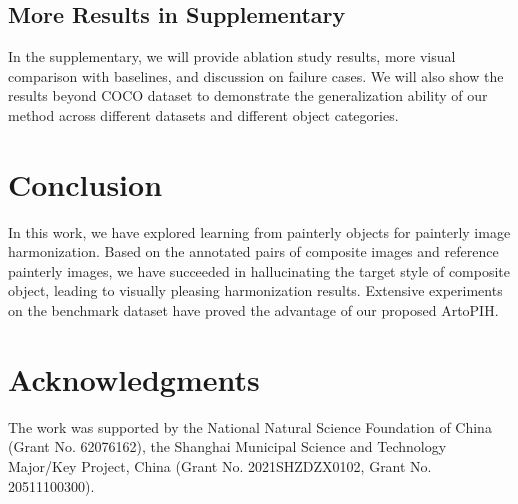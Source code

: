 \documentclass[letterpaper]{article} %
\begin{document}
\subsection{More Results in Supplementary}

In the supplementary, we will provide ablation study results, more visual comparison with baselines, and discussion on failure cases. We will also show the results beyond COCO \cite{lin2014microsoft} dataset to demonstrate the generalization ability of our method across different datasets and different object categories.

\section{Conclusion}
In this work, we have explored learning from painterly objects for painterly image harmonization. Based on the annotated pairs of composite images and reference painterly images, we have succeeded in hallucinating the target style of composite object, leading to visually pleasing harmonization results. Extensive experiments on the benchmark dataset have proved the advantage of our proposed ArtoPIH.




\section*{Acknowledgments}
The work was supported by the National Natural Science Foundation of China (Grant No. 62076162), the Shanghai Municipal Science and Technology Major/Key Project, China (Grant No. 2021SHZDZX0102, Grant No. 20511100300).
\end{document}
